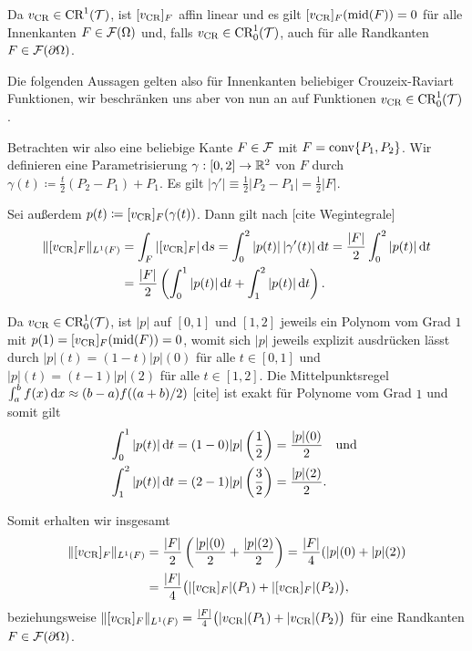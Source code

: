 Da $v_\textup{CR}\in\textup{CR}^1(\mathcal{T})$,
ist $[v_\textup{CR}]_F$ affin linear und es gilt $[v_\textup{CR}]_F(\textup{mid}(F))=0$ für 
alle Innenkanten $F\in\mathcal{F}(\Omega)$ und, falls 
$v_\textup{CR}\in\textup{CR}^1_0(\mathcal{T})$, auch für alle Randkanten $F\in\mathcal{F}(\partial\Omega)$.

Die folgenden Aussagen gelten also für Innenkanten beliebiger
Crouzeix-Raviart Funktionen, wir beschränken uns aber von nun
an auf Funktionen $v_\textup{CR}\in\textup{CR}^1_0(\mathcal{T})$.

Betrachten wir also eine beliebige Kante $F\in\mathcal{F}$
mit $F=\textup{conv}\{P_1,P_2\}$. 
Wir definieren eine Parametrisierung $\gamma:[0,2]\to\mathbb{R}^2$ von $F$ durch
$\gamma(t)\coloneqq \frac{t}{2}(P_2-P_1)+P_1$. 
Es gilt $|\gamma'|\equiv \frac{1}{2}|P_2-P_1|=\frac{1}{2}|F|$.

Sei außerdem
$p(t)\coloneqq [v_\textup{CR}]_F(\gamma(t))$. Dann gilt nach
 [cite Wegintegrale] 
\begin{align*}
  \Vert [v_\textup{CR}]_F\Vert_{L^1(F)} 
  &=
  \int_F |[v_\textup{CR}]_F|\,\mathrm{d}s 
  = \int_0^2 |p(t)|\,|\gamma'(t)|\,\mathrm{d}t
  = \frac{|F|}{2}\int_0^2 |p(t)|\,\mathrm{d}t\\
  &= \frac{|F|}{2}\left(\int_0^1 |p(t)|\,\mathrm{d}t + \int_1^2 |p(t)|\,\mathrm{d}t\right).
\end{align*}

Da $v_\textup{CR}\in\textup{CR}^1_0(\mathcal{T})$, ist $|p|$ auf $[0,1]$ und $[1,2]$ jeweils
ein Polynom
vom Grad $1$ mit $p(1)=[v_\textup{CR}]_F(\textup{mid}(F))=0$, womit sich $|p|$ jeweils
explizit ausdrücken lässt durch
$|p|(t)=(1-t)|p|(0)$ für alle $t\in[0,1]$ und 
$|p|(t)=(t-1)|p|(2)$ für alle $t\in[1,2]$.
Die Mittelpunktsregel $\int_a^b f(x)\,\mathrm{d}x\approx (b-a)f( (a+b)/2)$ [cite] ist
exakt für Polynome vom Grad $1$ und somit gilt
\begin{align*}
  \int_0^1 |p(t)|\,\mathrm{d}t 
  &= 
  (1-0)|p|\left( \frac{1}{2} \right)
  =
  \frac{|p|(0)}{2}\quad\text{und }\\
  \int_1^2 |p(t)|\,\mathrm{d}t 
  &= 
  (2-1)|p|\left( \frac{3}{2} \right)
  =
  \frac{|p|(2)}{2}.
\end{align*}

Somit erhalten wir insgesamt 
\begin{align*}
  \Vert [v_\textup{CR}]_F\Vert_{L^1(F)} 
  &=
  \frac{|F|}{2}\left(\frac{|p|(0)}{2} + \frac{|p|(2)}{2}\right)
  =
  \frac{|F|}{4}(|p|(0)+|p|(2))\\
  &= 
  \frac{|F|}{4}\big(|[v_\textup{CR}]_F|(P_1)+|[v_\textup{CR}]_F|(P_2)\big),
\end{align*}
beziehungsweise 
  $\Vert [v_\textup{CR}]_F\Vert_{L^1(F)} =
  \frac{|F|}{4}\big(|v_\textup{CR}|(P_1)+|v_\textup{CR}|(P_2)\big)$ für eine Randkanten
  $F\in\mathcal{F}(\partial\Omega)$.


